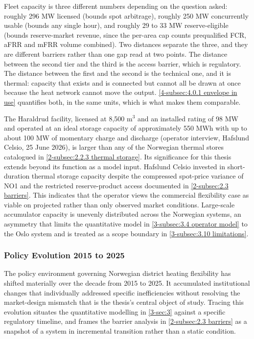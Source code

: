 \begin{keypoint}
Fleet capacity is three different numbers depending on the question asked: roughly 296 MW licensed (bounds spot arbitrage), roughly 250 MW concurrently usable (bounds any single hour), and roughly 29 to 33 MW reserve-eligible (bounds reserve-market revenue, since the per-area cap counts prequalified FCR, aFRR and mFRR volume combined). Two distances separate the three, and they are different barriers rather than one gap read at two points. The distance between the second tier and the third is the access barrier, which is regulatory. The distance between the first and the second is the technical one, and it is thermal: capacity that exists and is connected but cannot all be drawn at once because the heat network cannot move the output. \autoref{4-subsec:4.0.1 envelope in use} quantifies both, in the same units, which is what makes them comparable.
\end{keypoint}

The Haraldrud facility, licensed at 8,500 m$^3$ and an installed rating of 98 MW \cite{nve_konsesjonssak_2026} and operated at an ideal storage capacity of approximately 550 MWh with up to about 100 MW of momentary charge and discharge (operator interview, Hafslund Celsio, 25 June 2026), is larger than any of the Norwegian thermal stores catalogued in \autoref{2-subsec:2.2.3 thermal storage}. Its significance for this thesis extends beyond its function as a model input. Hafslund Celsio invested in short-duration thermal storage capacity despite the compressed spot-price variance of NO1 and the restricted reserve-product access documented in \autoref{2-subsec:2.3 barriers}. This indicates that the operator views the commercial flexibility case as viable on projected rather than only observed market conditions. Large-scale accumulator capacity is unevenly distributed across the Norwegian systems, an asymmetry that limits the quantitative model in \autoref{3-subsec:3.4 operator model} to the Oslo system and is treated as a scope boundary in \autoref{3-subsec:3.10 limitations}.


\subsubsection{Policy Evolution 2015 to 2025}
\label{2-subsec:2.4.2 policy evolution}

The policy environment governing Norwegian district heating flexibility has shifted materially over the decade from 2015 to 2025. It accumulated institutional changes that individually addressed specific inefficiencies without resolving the market-design mismatch that is the thesis's central object of study. Tracing this evolution situates the quantitative modelling in \autoref{3-sec:3} against a specific regulatory timeline, and frames the barrier analysis in \autoref{2-subsec:2.3 barriers} as a snapshot of a system in incremental transition rather than a static condition.

